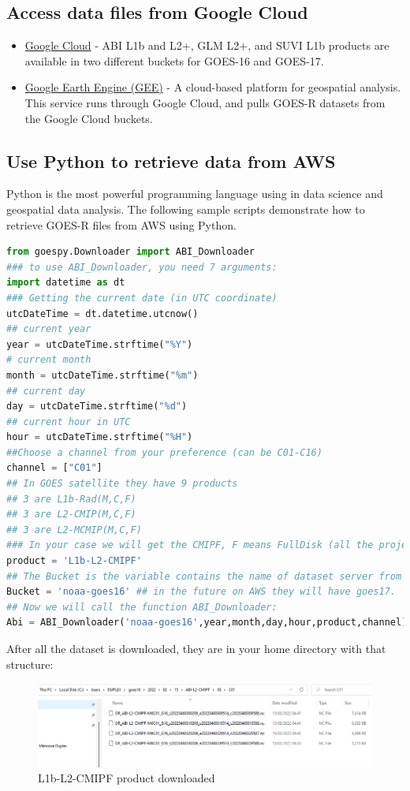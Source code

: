\subsection{Access data files from Google Cloud}
\begin{itemize}
\item \href{https://console.cloud.google.com/marketplace/product/noaa-public/goes-16?filter=category:science-research&id=5babd633-afa0-4e40-9dba-0587f4aabc47}{Google Cloud} - ABI L1b and L2+, GLM L2+, and SUVI L1b products are available in two different buckets for GOES-16 and GOES-17. 
\item \href{https://developers.google.com/earth-engine}{Google Earth Engine (GEE)} - A cloud-based platform for geospatial analysis. This service runs through 
Google Cloud, and pulls GOES-R datasets from the Google Cloud buckets. 
\end{itemize}
\subsection{Use Python to retrieve data from AWS}
Python is the most powerful programming language using in data science and geospatial data analysis.
The following sample scripts demonstrate how to retrieve GOES-R files from AWS using  Python. 
\begin{lstlisting}[language=Python]
from goespy.Downloader import ABI_Downloader
### to use ABI_Downloader, you need 7 arguments:
import datetime as dt 
### Getting the current date (in UTC coordinate)
utcDateTime = dt.datetime.utcnow() 
## current year
year = utcDateTime.strftime("%Y")
# current month
month = utcDateTime.strftime("%m")
## current day
day = utcDateTime.strftime("%d")
## current hour in UTC 
hour = utcDateTime.strftime("%H")
##Choose a channel from your preference (can be C01-C16)
channel = ["C01"]
## In GOES satellite they have 9 products
## 3 are L1b-Rad(M,C,F)
## 3 are L2-CMIP(M,C,F)
## 3 are L2-MCMIP(M,C,F)
### In your case we will get the CMIPF, F means FullDisk (all the projection by the satellite)
product = 'L1b-L2-CMIPF'
## The Bucket is the variable contains the name of dataset server from goes on AWS
Bucket = 'noaa-goes16' ## in the future on AWS they will have goes17.
## Now we will call the function ABI_Downloader:
Abi = ABI_Downloader('noaa-goes16',year,month,day,hour,product,channel)
\end{lstlisting}
After all the dataset is downloaded, they are in your home directory with that structure:
\begin{figure}[H]
\begin{center}
\includegraphics[scale=0.6]{file1.png} %
\end{center}
\caption{L1b-L2-CMIPF product downloaded}
\label{L1b-L2-CMIPF product downloaded}%
\end{figure}
